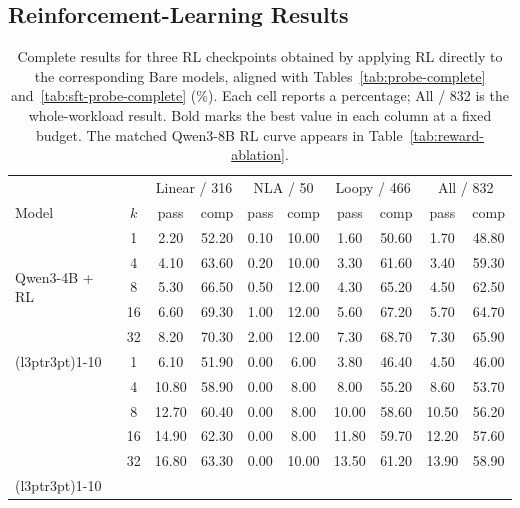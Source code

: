 \subsection{Reinforcement-Learning Results}
\label{app:rl-results}

\begin{table}[H]
\centering
\small
\renewcommand{\arraystretch}{0.86}
\setlength{\tabcolsep}{2.4pt}
\caption{Complete results for three RL checkpoints obtained by applying RL
directly to the corresponding Bare models, aligned with
Tables~\ref{tab:probe-complete} and~\ref{tab:sft-probe-complete} (\%).
Each cell reports a percentage; All / 832 is the whole-workload result.
Bold marks the best value in each column at a fixed budget.  The matched
Qwen3-8B RL curve appears in Table~\ref{tab:reward-ablation}.}
\label{tab:rlzero-additional}
\begin{tabular}{lccccccccc}
\toprule
\rowcolor{algobg}
& & \multicolumn{2}{c}{Linear / 316} & \multicolumn{2}{c}{NLA / 50}
  & \multicolumn{2}{c}{Loopy / 466} & \multicolumn{2}{c}{All / 832} \\
\headercmidrules{\cmidrule(lr){3-4}\cmidrule(lr){5-6}\cmidrule(lr){7-8}\cmidrule(lr){9-10}}
\rowcolor{algobg}
Model & \(k\) & pass & comp & pass & comp & pass & comp & pass & comp \\
\midrule
\multirow{5}{*}{Qwen3-4B + RL}
 & 1  & 2.20 & 52.20 & 0.10 & 10.00 & 1.60 & 50.60 & 1.70 & 48.80 \\
 & 4  & 4.10 & 63.60 & 0.20 & 10.00 & 3.30 & 61.60 & 3.40 & 59.30 \\
 & 8  & 5.30 & 66.50 & 0.50 & 12.00 & 4.30 & 65.20 & 4.50 & 62.50 \\
 & 16 & 6.60 & 69.30 & 1.00 & 12.00 & 5.60 & 67.20 & 5.70 & 64.70 \\
 & 32 & 8.20 & 70.30 & 2.00 & 12.00 & 7.30 & 68.70 & 7.30 & 65.90 \\
\cmidrule(l{3pt}r{3pt}){1-10}
\multirow{5}{*}{Llama 3.1-8B + RL}
 & 1  & 6.10 & 51.90 & 0.00 & 6.00  & 3.80 & 46.40 & 4.50 & 46.00 \\
 & 4  & 10.80 & 58.90 & 0.00 & 8.00  & 8.00 & 55.20 & 8.60 & 53.70 \\
 & 8  & 12.70 & 60.40 & 0.00 & 8.00  & 10.00 & 58.60 & 10.50 & 56.20 \\
 & 16 & 14.90 & 62.30 & 0.00 & 8.00  & 11.80 & 59.70 & 12.20 & 57.60 \\
 & 32 & 16.80 & 63.30 & 0.00 & 10.00 & 13.50 & 61.20 & 13.90 & 58.90 \\
\cmidrule(l{3pt}r{3pt}){1-10}
\multirow{5}{*}{Qwen3-14B + RL}

\end{tabular}
\end{table}
